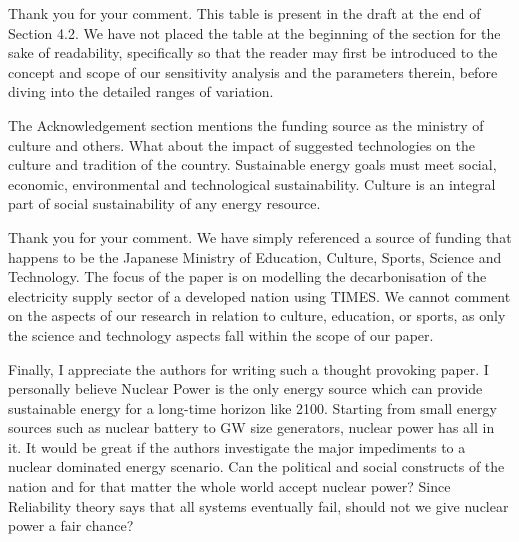 \documentclass[answers,11pt]{exam}
\begin{document}
\begin{questions}
\begin{solution}
                 Thank you for your comment. This table is present in the draft at the end of Section 4.2. We have not placed the table at the beginning of the section for the sake of readability, specifically so that the reader may first be introduced to the concept and scope of our sensitivity analysis and the parameters therein, before diving into the detailed ranges of variation.
                 
                 
        \end{solution} 
                        \question   The Acknowledgement section mentions the funding source as the ministry of culture and others. What about the impact of suggested technologies on the culture and tradition of the country. Sustainable energy goals must meet social, economic, environmental and technological sustainability. Culture is an integral part of social sustainability of any energy resource. 
                                
        \begin{solution}
        
                 Thank you for your comment. We have simply referenced a source of funding that happens to be the Japanese Ministry of Education, Culture, Sports, Science and Technology. The focus of the paper is on modelling the decarbonisation of the electricity supply sector of a developed nation using TIMES. We cannot comment on the aspects of our research in relation to culture, education, or sports, as only the science and technology aspects fall within the scope of our paper.
                 
                 
        \end{solution} 
                        \question   Finally, I appreciate the authors for writing such a  thought provoking paper. I personally believe Nuclear Power is the only energy source which can provide sustainable energy for a long-time horizon like 2100. Starting from small energy sources such as nuclear battery to GW size generators, nuclear power has all in it. It would be great if the authors investigate the major impediments to a nuclear dominated energy scenario. Can the political and social constructs of the nation and for that matter the whole world accept nuclear power? Since Reliability theory says that all systems eventually fail, should not we give nuclear power a fair chance?  
                                

\end{questions}
\end{document}
